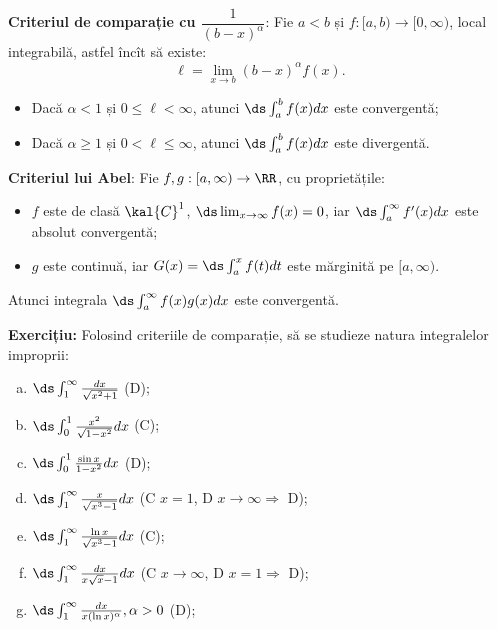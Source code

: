 \vspace{0.5cm}

\textbf{Criteriul de comparație cu $\dfrac{1}{(b - x)^\alpha}$}: Fie $a < b$ și
$f : [a, b) \to [0, \infty)$, local integrabilă, astfel încît să existe:
\[
  \ell = \lim_{x \to b} (b - x)^\alpha f(x).
\]
\begin{itemize}
\item Dacă $\alpha < 1$ și $0 \leq \ell < \infty$, atunci $\ds\int_a^b f(x) dx$
  este convergentă;
\item Dacă $\alpha \geq 1$ și $0 < \ell \leq \infty$, atunci $\ds\int_a^b f(x) dx$
  este divergentă.
\end{itemize}

\vspace{0.5cm}

\textbf{Criteriul lui Abel}: Fie $f, g : [a, \infty) \to \RR$, cu proprietățile:
\begin{itemize}
\item $f$ este de clasă $\kal{C}^1$, $\ds\lim_{x \to \infty} f(x) = 0$, iar
  $\ds\int_a^\infty f'(x) dx$ este absolut convergentă;
\item $g$ este continuă, iar $G(x) = \ds\int_a^x f(t) dt$ este mărginită pe
  $[a, \infty)$.
\end{itemize}
Atunci integrala $\ds\int_a^\infty f(x) g(x) dx$ este convergentă.

\vspace{0.5cm}

\textbf{Exercițiu:} 
Folosind criteriile de comparație, să se studieze natura integralelor improprii:
\begin{enumerate}[(a)]
\item $\ds\int_1^\infty \frac{dx}{\sqrt{x^2 + 1}}$ \hfill(D);
\item $\ds\int_0^1 \frac{x^2}{\sqrt{1 - x^2}} dx$ \hfill(C);
\item $\ds\int_0^1 \frac{\sin x}{1 - x^2} dx$ \hfill(D);
\item $\ds\int_1^\infty \frac{x}{\sqrt{x^3 - 1}} dx$ \hfill(C $x = 1$, D
  $x \to \infty \Rightarrow$ D);
\item $\ds\int_1^\infty \frac{\ln x}{\sqrt{x^3 - 1}} dx$ \hfill(C);
\item $\ds\int_1^\infty \frac{dx}{x \sqrt{x} - 1} dx$ \hfill(C $x \to \infty$,
  D $x = 1 \Rightarrow$ D);
\item $\ds\int_1^\infty \frac{dx}{x(\ln x)^\alpha}, \alpha > 0$ \hfill(D);
\end{enumerate}

